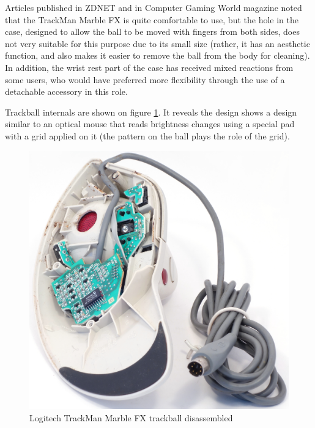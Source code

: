 \documentclass[11pt, a4paper]{article}
\begin{document}
Articles published in ZDNET \cite{zdnet} and in Computer Gaming World magazine \cite{gaming} noted that the TrackMan Marble FX is quite comfortable to use, but the hole in the case, designed to allow the ball to be moved with fingers from both sides, does not very suitable for this purpose due to its small size (rather, it has an aesthetic function, and also makes it easier to remove the ball from the body for cleaning). In addition, the wrist rest part of the case has received mixed reactions from some users, who would have preferred more flexibility through the use of a detachable accessory in this role.

Trackball internals are shown on figure \ref{fig:trackmanInside}. It reveals the design shows a design similar to an optical mouse that reads brightness changes using a special pad with a grid applied on it (the pattern on the ball plays the role of the grid).

\begin{figure}[h]
    \centering
    \includegraphics[scale=0.6]{1998_logitech_trackman_marble_fx/inside_30.jpg}
    \caption{Logitech TrackMan Marble FX trackball disassembled}
    \label{fig:trackmanInside}
\end{figure}
\end{document}
